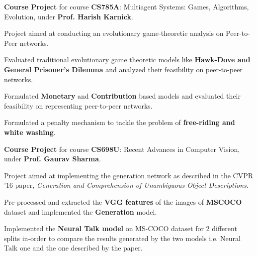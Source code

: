 \documentclass[a4paper]{norm-resume}
\begin{document}
					
	\begin{tightitemize}
	\small
	{
	\item \textbf{Course Project} for course \textbf{CS785A}: Multiagent Systems: Games, Algorithms, Evolution, under \textbf{Prof. Harish Karnick}.
    \item Project aimed at conducting an evolutionary game-theoretic analysis on Peer-to-Peer networks.
    \item Evaluated traditional evolutionary game theoretic models like \textbf{Hawk-Dove and General Prisoner's Dilemma} and analyzed their feasibility on peer-to-peer networks.
    \item Formulated \textbf{Monetary} and \textbf{Contribution} based models and evaluated their feasibility on representing peer-to-peer networks.
    \item Formulated a penalty mechanism to tackle the problem of \textbf{free-riding and white washing}.
	}
	\end{tightitemize}
		
	\vspace{2mm}
	
				\descript{Aug '16 - Nov '16}	
	\begin{tightitemize}
	\small
	{
	\item \textbf{Course Project} for course \textbf{CS698U}: Recent Advances in Computer Vision, under \textbf{Prof. Gaurav Sharma}.
    \item Project aimed at implementing the generation network as described in the CVPR '16 paper, \textit{Generation and Comprehension of Unambiguous Object Descriptions}.
    \item Pre-processed and extracted the \textbf{VGG features} of the images of \textbf{MSCOCO} dataset and implemented the \textbf{Generation} model.
    \item Implemented the \textbf{Neural Talk model} on MS-COCO dataset for 2 different splits in-order to compare the results generated by the two models i.e. Neural Talk one and the one described by the paper.
	}
	\end{tightitemize}
		
	\vspace{2mm}
	
\end{document}
